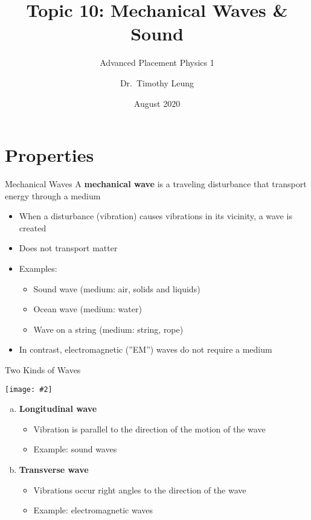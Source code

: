 \documentclass[12pt,aspectratio=169]{beamer}
\title[Waves]{Topic 10: Mechanical Waves \& Sound}
\subtitle{Advanced Placement Physics 1}
\author[TML]{Dr.\ Timothy Leung}
\institute{Olympiads School\\Toronto, Ontario, Canada}
\date{August 2020}
\newcommand{\pic}[2]{\texttt{[image: \#2]}}
\begin{document}
\begin{frame}
  \titlepage
\end{frame}



\section{Properties}

\begin{frame}{Mechanical Waves}
  A \textbf{mechanical wave} is a traveling disturbance that transport energy
  through a medium
  \begin{itemize}
  \item When a disturbance (vibration) causes vibrations in its vicinity, a
    wave is created
  \item Does not transport matter
  \item Examples:
    \begin{itemize}
    \item Sound wave (medium: air, solids and liquids)
    \item Ocean wave (medium: water)
    \item Wave on a string (medium: string, rope)
    \end{itemize}
  \item In contrast, electromagnetic (''EM'') waves do not require a medium
  \end{itemize}
\end{frame}




\begin{frame}{Two Kinds of Waves}
  \begin{center}
    \pic{.6}{main-qimg.png}
  \end{center}
  \begin{enumerate}[a.]
  \item\textbf{Longitudinal wave}
    \begin{itemize}
    \item Vibration is parallel to the direction of the motion of the wave
    \item Example: sound waves
    \end{itemize}
  \item\textbf{Transverse wave}
    \begin{itemize}
    \item Vibrations occur right angles to the direction of the wave
    \item Example: electromagnetic waves
    \end{itemize}
  \end{enumerate}
\end{frame}
\end{document}
